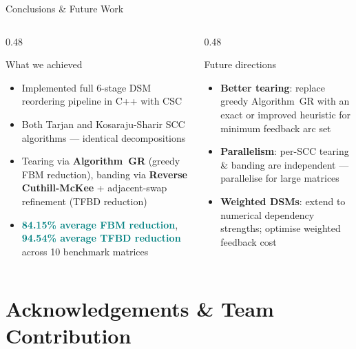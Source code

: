 \documentclass[aspectratio=169]{beamer}
\newcommand{\highlight}[1]{\textcolor{teal}{\textbf{#1}}}
\begin{document}
\begin{frame}{Conclusions \& Future Work}
  \begin{columns}[T]
    \begin{column}{0.48\textwidth}
      \begin{block}{What we achieved}
        \begin{itemize}
          \item Implemented full 6-stage DSM reordering pipeline in C++ with CSC
          \item Both Tarjan and Kosaraju-Sharir SCC algorithms — identical decompositions
          \item Tearing via \textbf{Algorithm~GR} (greedy FBM reduction), banding via \textbf{Reverse Cuthill-McKee} + adjacent-swap refinement (TFBD reduction)
          \item \highlight{84.15\% average FBM reduction}, \highlight{94.54\% average TFBD reduction} across 10 benchmark matrices
        \end{itemize}
      \end{block}
    \end{column}
    \begin{column}{0.48\textwidth}
      \begin{block}{Future directions}
        \begin{itemize}
          \item \textbf{Better tearing}: replace greedy Algorithm~GR with an exact or improved heuristic for minimum feedback arc set
          \item \textbf{Parallelism}: per-SCC tearing \& banding are independent — parallelise for large matrices
          \item \textbf{Weighted DSMs}: extend to numerical dependency strengths; optimise weighted feedback cost
        \end{itemize}
      \end{block}
    \end{column}
  \end{columns}
\end{frame}

\section*{Acknowledgements \& Team Contribution}
\end{document}
